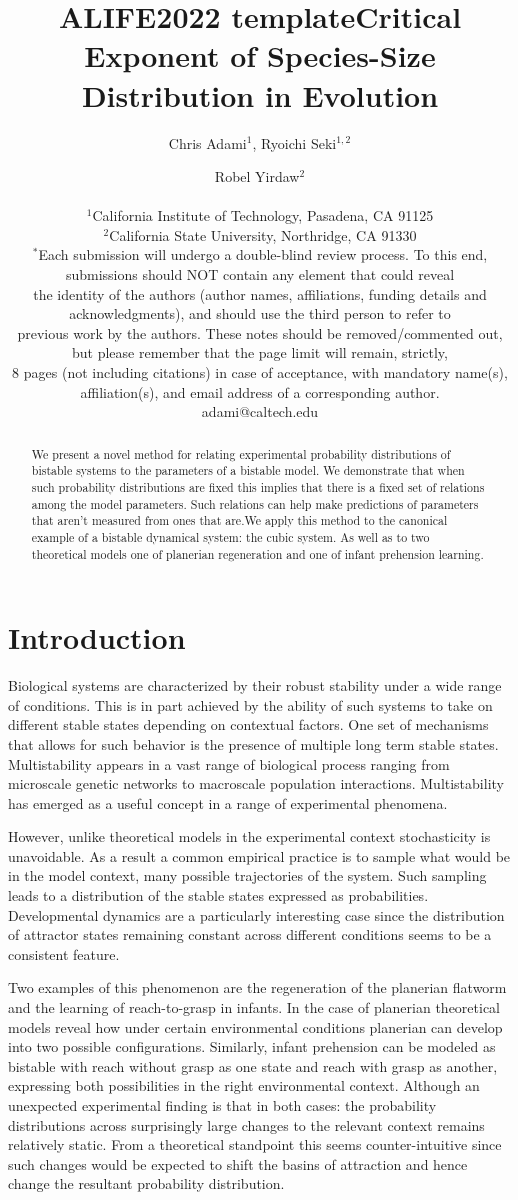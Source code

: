 \documentclass[letterpaper]{article}
\title{ALIFE2022 template}
\title{Critical Exponent of Species-Size Distribution in Evolution}
\author{Chris Adami$^{1}$, Ryoichi Seki$^{1,2}$ \and Robel Yirdaw$^2$ \\
\mbox{}\\
$^1$California Institute of Technology, Pasadena, CA 91125 \\
$^2$California State University, Northridge, CA 91330 \\
$^*$Each submission will undergo a double-blind review process. To this end, submissions should NOT contain any element that could reveal \\ the identity of the authors (author names, affiliations, funding details and acknowledgments), and should use the third person to refer to \\ previous work by the authors. These notes should be removed/commented out, but please remember that the page limit will remain, strictly, \\8 pages (not including citations) in case of acceptance, with mandatory name(s), affiliation(s), and email address of a corresponding author. \\
adami@caltech.edu} %
\begin{document}
\maketitle

\begin{abstract}
    We present a novel method for relating experimental probability
    distributions of bistable systems to the parameters of a
    bistable model. We demonstrate that when such probability 
    distributions are fixed this implies that there is a fixed
    set of relations among the model parameters. Such relations 
    can help make predictions of parameters that aren't measured
    from ones that are.We apply this method
    to the canonical example of a bistable dynamical system: the cubic
    system.
    As well as to two theoretical models one of planerian regeneration
    and one of infant prehension learning.
\end{abstract}

\section{Introduction}
Biological systems are characterized by their robust stability under
a wide range of conditions. This is in part achieved by the ability
of such systems to take on different stable states
depending on contextual factors. One set of mechanisms that allows for such 
behavior is the presence of multiple long term stable states. Multistability
appears in a vast range of biological process ranging from microscale
genetic networks to macroscale population interactions. Multistability has
emerged as a useful concept in a range of experimental phenomena.

However, unlike theoretical models in the experimental context stochasticity
is unavoidable. As a result a common empirical practice is to sample what 
would be in the model context, many possible trajectories of the system. 
Such sampling leads to a distribution of the stable states expressed as 
probabilities. Developmental dynamics are a particularly interesting case 
since the distribution of attractor states remaining constant across 
different conditions seems to be a consistent feature.

Two examples of this phenomenon are the regeneration of the planerian flatworm
and the learning of reach-to-grasp in infants. In the case of planerian
theoretical models reveal how under certain environmental conditions 
planerian can develop into two possible configurations. Similarly, infant
prehension can be modeled as bistable with reach without grasp as one state
and reach with grasp as another, expressing both possibilities in the right
environmental context. Although an unexpected experimental finding is that in
both cases: the probability distributions across surprisingly large changes
to the relevant context remains relatively static. 
From a theoretical standpoint this seems 
counter-intuitive since such changes would be expected to shift the basins
of attraction and hence change the resultant probability distribution.
\end{document}
